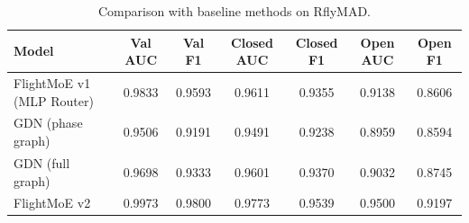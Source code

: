 \begin{table}[htbp]
\centering
\caption{Comparison with baseline methods on RflyMAD.}
\label{tab:baseline}
\begin{tabular}{lcccccc}
\toprule
Model & Val AUC & Val F1 & Closed AUC & Closed F1 & Open AUC & Open F1 \\
\midrule
FlightMoE v1 (MLP Router) & 0.9833 & 0.9593 & 0.9611 & 0.9355 & 0.9138 & 0.8606 \\
GDN (phase graph) & 0.9506 & 0.9191 & 0.9491 & 0.9238 & 0.8959 & 0.8594 \\
GDN (full graph) & 0.9698 & 0.9333 & 0.9601 & 0.9370 & 0.9032 & 0.8745 \\
FlightMoE v2 & 0.9973 & 0.9800 & 0.9773 & 0.9539 & 0.9500 & 0.9197 \\
\bottomrule
\end{tabular}
\end{table}
